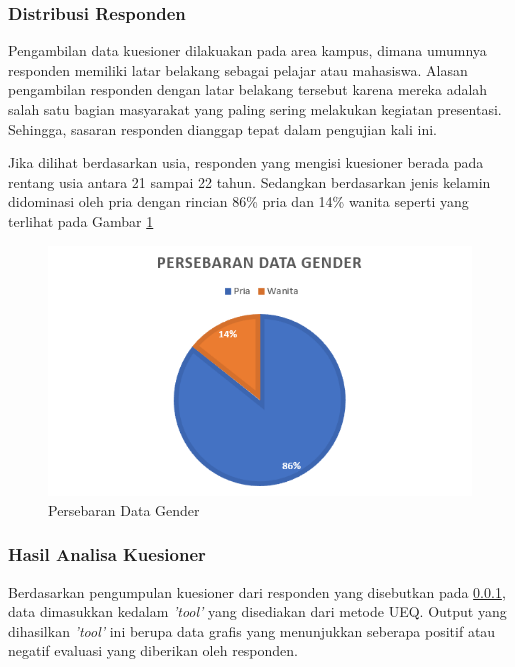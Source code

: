 \subsubsection{Distribusi Responden}
\label{subsubsec:Distribusi Responden}

Pengambilan data kuesioner dilakuakan pada area kampus, dimana umumnya responden memiliki latar belakang sebagai pelajar atau mahasiswa. Alasan pengambilan responden dengan latar belakang tersebut karena mereka adalah salah satu bagian masyarakat yang paling sering melakukan kegiatan presentasi. Sehingga, sasaran responden dianggap tepat dalam pengujian kali ini. 

Jika dilihat berdasarkan usia, responden yang mengisi kuesioner berada pada rentang usia antara 21 sampai 22 tahun. Sedangkan berdasarkan jenis kelamin didominasi oleh pria dengan rincian 86\% pria dan 14\% wanita seperti yang terlihat pada Gambar \ref{fig:Persebaran Data Gender}  

\begin{figure}[!htb]
  \centering
  \includegraphics[scale=1]{gambar/pengujian-user-experience/persebaran-data-gender.png}
  \caption{Persebaran Data Gender}
  \label{fig:Persebaran Data Gender}
\end{figure}

\subsubsection{Hasil Analisa Kuesioner}
\label{subsubsec:Hasil Analisa Kuesioner}

Berdasarkan pengumpulan kuesioner dari responden yang disebutkan pada \ref{subsubsec:Distribusi Responden}, data dimasukkan kedalam \emph{'tool'} yang disediakan dari metode UEQ. Output yang dihasilkan \emph{'tool'} ini berupa data grafis yang menunjukkan seberapa positif atau negatif evaluasi yang diberikan oleh responden. 

